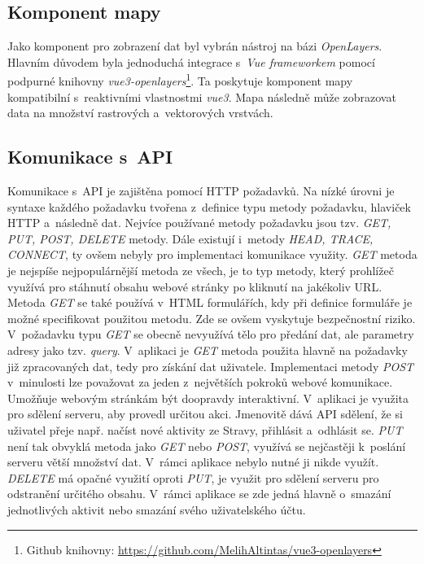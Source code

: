 \subsection{Komponent mapy}
Jako komponent pro zobrazení dat byl vybrán nástroj na bázi \emph{OpenLayers}. Hlavním důvodem byla jednoduchá integrace s~\emph{Vue frameworkem} pomocí podpurné knihovny \emph{vue3-openlayers}\footnote{Github knihovny: \url{https://github.com/MelihAltintas/vue3-openlayers}}. Ta poskytuje komponent mapy kompatibilní s~reaktivními vlastnostmi \emph{vue3}. Mapa následně může zobrazovat data na množství rastrových a~vektorových vrstvách. \cite{openlayers1}
\subsection{Komunikace s~API}
\label{httpreq}
Komunikace s~API je zajištěna pomocí HTTP požadavků. Na nízké úrovni je syntaxe každého požadavku tvořena z~definice typu metody požadavku, hlaviček HTTP a~následně dat. Nejvíce používané metody požadavku jsou tzv. \emph{GET, PUT, POST, DELETE} metody. Dále existují i~metody \emph{HEAD, TRACE, CONNECT}, ty ovšem nebyly pro implementaci komunikace využity. \emph{GET} metoda je nejspíše nejpopulárnější metoda ze všech, je to typ metody, který prohlížeč využívá pro stáhnutí obsahu webové stránky po kliknutí na jakékoliv URL. Metoda \emph{GET} se také používá v~HTML formulářích, kdy při definice formuláře je možné specifikovat použitou metodu. Zde se ovšem vyskytuje bezpečnostní riziko. V~požadavku typu \emph{GET} se obecně nevyužívá tělo pro předání dat, ale parametry adresy jako tzv. \emph{query}. V~aplikaci je \emph{GET} metoda použita hlavně na požadavky již zpracovaných dat, tedy pro získání dat uživatele. Implementaci metody \emph{POST} v~minulosti lze považovat za jeden z~největších pokroků webové komunikace. Umožňuje webovým stránkám být doopravdy interaktivní. V~aplikaci je využita pro sdělení serveru, aby provedl určitou akci. Jmenovitě dává API sdělení, že si uživatel přeje např. načíst nové aktivity ze Stravy, přihlásit a~odhlásit se. \emph{PUT} není tak obvyklá metoda jako \emph{GET} nebo \emph{POST}, využívá se nejčastěji k~poslání serveru větší množství dat. V~rámci aplikace nebylo nutné ji nikde využít. \emph{DELETE} má opačné využití oproti \emph{PUT}, je využit pro sdělení serveru pro odstranění určitého obsahu. V~rámci aplikace se zde jedná hlavně o~smazání jednotlivých aktivit nebo smazání svého uživatelského účtu.~\cite{httprequests}

